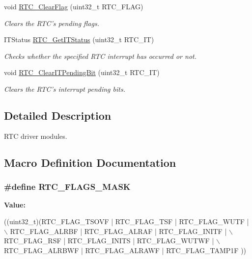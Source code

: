 \begin{DoxyCompactItemize}
void \hyperlink{group___r_t_c_ga9be3325e05418d05c8c5a5ad369c7d50}{R\-T\-C\-\_\-\-Clear\-Flag} (uint32\-\_\-t R\-T\-C\-\_\-\-F\-L\-A\-G)
\begin{DoxyCompactList}\small\item\em Clears the R\-T\-C's pending flags. \end{DoxyCompactList}\item 
I\-T\-Status \hyperlink{group___r_t_c_gaab81adc6d2a5a5c1e37a49707c6bf640}{R\-T\-C\-\_\-\-Get\-I\-T\-Status} (uint32\-\_\-t R\-T\-C\-\_\-\-I\-T)
\begin{DoxyCompactList}\small\item\em Checks whether the specified R\-T\-C interrupt has occurred or not. \end{DoxyCompactList}\item 
void \hyperlink{group___r_t_c_gacac6accc75ae54f1b799fa8e7e83ccdb}{R\-T\-C\-\_\-\-Clear\-I\-T\-Pending\-Bit} (uint32\-\_\-t R\-T\-C\-\_\-\-I\-T)
\begin{DoxyCompactList}\small\item\em Clears the R\-T\-C's interrupt pending bits. \end{DoxyCompactList}\end{DoxyCompactItemize}


\subsection{Detailed Description}
R\-T\-C driver modules. 

\subsection{Macro Definition Documentation}
\hypertarget{group___r_t_c_ga0c7513e50528d7b5a52e88340a4e7b25}{
\subsubsection[{R\-T\-C\-\_\-\-F\-L\-A\-G\-S\-\_\-\-M\-A\-S\-K}]{\setlength{\rightskip}{0pt plus 5cm}\#define R\-T\-C\-\_\-\-F\-L\-A\-G\-S\-\_\-\-M\-A\-S\-K}}\label{group___r_t_c_ga0c7513e50528d7b5a52e88340a4e7b25}
{\bfseries Value\-:}
\begin{DoxyCode}
((uint32\_t)(RTC\_FLAG\_TSOVF | RTC\_FLAG\_TSF | RTC\_FLAG\_WUTF | \(\backslash\)
                                            RTC\_FLAG\_ALRBF | RTC\_FLAG\_ALRAF | RTC\_FLAG\_INITF | \(\backslash\)
                                            RTC\_FLAG\_RSF | RTC\_FLAG\_INITS | RTC\_FLAG\_WUTWF | \(\backslash\)
                                            RTC\_FLAG\_ALRBWF | RTC\_FLAG\_ALRAWF | RTC\_FLAG\_TAMP1F ))
\end{DoxyCode}


